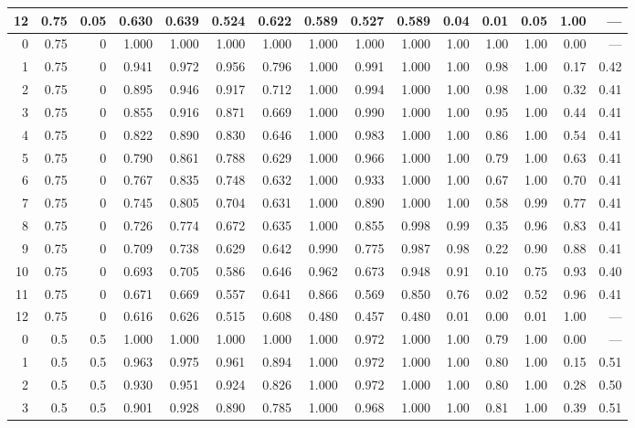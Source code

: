 \begin{landscape}
\begin{longtable}{rrrrrrrrrrrrrrr}
12 & 0.75 & 0.05 & 0.630 & 0.639 & 0.524 & 0.622 & 0.589 & 0.527 & 0.589 & 0.04 & 0.01 & 0.05 & 1.00 & --- \\
\midrule
0 & 0.75 & 0 & 1.000 & 1.000 & 1.000 & 1.000 & 1.000 & 1.000 & 1.000 & 1.00 & 1.00 & 1.00 & 0.00 & --- \\
1 & 0.75 & 0 & 0.941 & 0.972 & 0.956 & 0.796 & 1.000 & 0.991 & 1.000 & 1.00 & 0.98 & 1.00 & 0.17 & 0.42 \\
2 & 0.75 & 0 & 0.895 & 0.946 & 0.917 & 0.712 & 1.000 & 0.994 & 1.000 & 1.00 & 0.98 & 1.00 & 0.32 & 0.41 \\
3 & 0.75 & 0 & 0.855 & 0.916 & 0.871 & 0.669 & 1.000 & 0.990 & 1.000 & 1.00 & 0.95 & 1.00 & 0.44 & 0.41 \\
4 & 0.75 & 0 & 0.822 & 0.890 & 0.830 & 0.646 & 1.000 & 0.983 & 1.000 & 1.00 & 0.86 & 1.00 & 0.54 & 0.41 \\
5 & 0.75 & 0 & 0.790 & 0.861 & 0.788 & 0.629 & 1.000 & 0.966 & 1.000 & 1.00 & 0.79 & 1.00 & 0.63 & 0.41 \\
6 & 0.75 & 0 & 0.767 & 0.835 & 0.748 & 0.632 & 1.000 & 0.933 & 1.000 & 1.00 & 0.67 & 1.00 & 0.70 & 0.41 \\
7 & 0.75 & 0 & 0.745 & 0.805 & 0.704 & 0.631 & 1.000 & 0.890 & 1.000 & 1.00 & 0.58 & 0.99 & 0.77 & 0.41 \\
8 & 0.75 & 0 & 0.726 & 0.774 & 0.672 & 0.635 & 1.000 & 0.855 & 0.998 & 0.99 & 0.35 & 0.96 & 0.83 & 0.41 \\
9 & 0.75 & 0 & 0.709 & 0.738 & 0.629 & 0.642 & 0.990 & 0.775 & 0.987 & 0.98 & 0.22 & 0.90 & 0.88 & 0.41 \\
10 & 0.75 & 0 & 0.693 & 0.705 & 0.586 & 0.646 & 0.962 & 0.673 & 0.948 & 0.91 & 0.10 & 0.75 & 0.93 & 0.40 \\
11 & 0.75 & 0 & 0.671 & 0.669 & 0.557 & 0.641 & 0.866 & 0.569 & 0.850 & 0.76 & 0.02 & 0.52 & 0.96 & 0.41 \\
12 & 0.75 & 0 & 0.616 & 0.626 & 0.515 & 0.608 & 0.480 & 0.457 & 0.480 & 0.01 & 0.00 & 0.01 & 1.00 & --- \\
\midrule
0 & 0.5 & 0.5 & 1.000 & 1.000 & 1.000 & 1.000 & 1.000 & 0.972 & 1.000 & 1.00 & 0.79 & 1.00 & 0.00 & --- \\
1 & 0.5 & 0.5 & 0.963 & 0.975 & 0.961 & 0.894 & 1.000 & 0.972 & 1.000 & 1.00 & 0.80 & 1.00 & 0.15 & 0.51 \\
2 & 0.5 & 0.5 & 0.930 & 0.951 & 0.924 & 0.826 & 1.000 & 0.972 & 1.000 & 1.00 & 0.80 & 1.00 & 0.28 & 0.50 \\
3 & 0.5 & 0.5 & 0.901 & 0.928 & 0.890 & 0.785 & 1.000 & 0.968 & 1.000 & 1.00 & 0.81 & 1.00 & 0.39 & 0.51 \\

\end{longtable}
\end{landscape}
